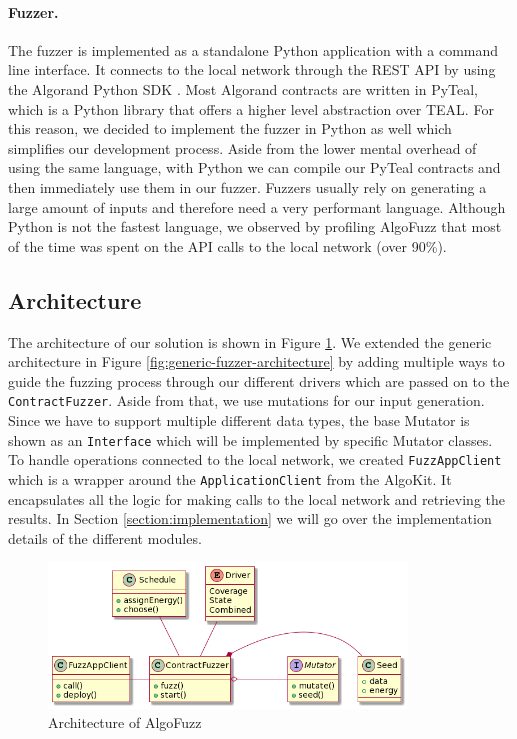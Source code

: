\paragraph*{Fuzzer.} The fuzzer is implemented as a standalone Python application with a command line interface.
It connects to the local network through the \acs{REST} \acs{API} by using the Algorand Python \acs{SDK} \cite{noauthor_algorand_nodate-5}.
Most Algorand contracts are written in PyTeal, which is a Python library that offers a higher level abstraction over \ac{TEAL}.
For this reason, we decided to implement the fuzzer in Python as well which simplifies our development process.
Aside from the lower mental overhead of using the same language, with Python we can compile our PyTeal contracts and then immediately use them in our fuzzer.
Fuzzers usually rely on generating a large amount of inputs and therefore need a very performant language.
Although Python is not the fastest language, we observed by profiling AlgoFuzz that most of the time was spent on the \acs{API} calls to the local network (over 90\%).

\subsection*{Architecture}
The architecture of our solution is shown in Figure \ref{fig:algofuzz-architecture}.
We extended the generic architecture in Figure \ref{fig:generic-fuzzer-architecture} by adding multiple ways to guide the fuzzing process through our different drivers which are passed on to the \texttt{ContractFuzzer}.
Aside from that, we use mutations for our input generation. Since we have to support multiple different data types, the base Mutator is shown as an \texttt{Interface} which will be implemented by specific Mutator classes.
To handle operations connected to the local network, we created \texttt{FuzzAppClient} which is a wrapper around the \texttt{ApplicationClient} from the AlgoKit.
It encapsulates all the logic for making calls to the local network and retrieving the results.
In Section \ref{section:implementation} we will go over the implementation details of the different modules.

\begin{figure}[!htbp]
    \centering
    \includegraphics[width=0.85\textwidth]{figures/arc.png}
    \caption{Architecture of AlgoFuzz}\label{fig:algofuzz-architecture}
\end{figure}

